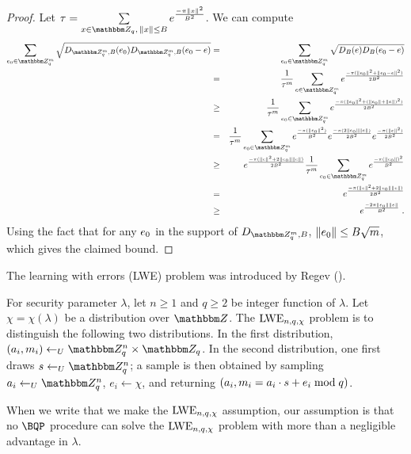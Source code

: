 \begin{proof}
Let $\tau = \sum\limits_{x\in\mZ_q,\, \|x\|\leq B}e^{\frac{-\pi\lVert x\rVert^2}{B^2}}$. We can compute
\begin{eqnarray*}
\sum_{\*e_0\in \mZ_q^m} \sqrt{D_{\mZ_q^{m},B}(\*e_0)D_{\mZ_q^{m},B}(\*e_0-\*e)} &=& \sum_{\*e_0\in \mZ_q^m}  \sqrt{D_{B}(\*e)D_{B}(\*e_0-\*e)}\\
&=& \frac{1}{\tau^m}\sum_{\*e\in \mZ_q^m}e^{\frac{-\pi(\|\*e_0\|^2 + \|\*e_0 - \*e\|^2)}{2B^2}}\\
&\geq& \frac{1}{\tau^m}\sum_{\*e_0\in \mZ_q^m}e^{\frac{-\pi(\|\*e_0\|^2 + (\|\*e_0\| + \|\*e\|)^2)}{2B^2}}\\
&=& \frac{1}{\tau^m}\sum_{\*e_0\in \mZ_q^m}e^{\frac{-\pi(\|\*e_0\|^2)}{B^2}}e^{\frac{-\pi(2\|\*e_0\|\|\*e\|)}{2B^2}}e^{\frac{-\pi(\|\*e\|^2)}{2B^2}}\\
&\geq& e^{\frac{-\pi(\|\*e\|^2 + 2\|\*e_0\|\|\*e\|)}{2B^2}}\frac{1}{\tau^m}\sum_{\*e_0\in \mZ_q^m}e^{\frac{-\pi(\|\*e_0\|)^2}{B^2}}\\
&=& e^{\frac{-\pi(\|\*e\|^2 + 2\|\*e_0\|\|\*e\|)}{2B^2}}\label{eq:distequality}\\
&\geq& e^{\frac{-2\pi \|\*e_0\|\|\*e\|}{B^2}}\;.
\end{eqnarray*}
Using the fact that for any $\*e_0$ in the support of $D_{\mZ_q^m,B}$, $\|\*e_0\|\leq B\sqrt{m}$, which gives the claimed bound.
\end{proof}


\iffalse
The learning with errors (LWE) problem was introduced by Regev (\cite{regev2005}).

\begin{deff}
For security parameter $\lambda$, let $n\geq 1$ and $q\geq 2$ be integer function of $\lambda$. Let $\chi = \chi(\lambda)$ be a distribution over $\mZ$. The $\mathrm{LWE}_{n,q,\chi}$ problem is to distinguish the following two distributions. In the first distribution, $(\*a_i,m_i)\leftarrow_U \mZ_q^{n}\times \mZ_q$. In the second distribution, one first draws $\*s\leftarrow_U \mZ_q^{n}$; a sample is then obtained by sampling $a_i\leftarrow_U \mZ_q^n$, $e_i\leftarrow \chi$, and returning $(a_i,m_i =  \*a_i\cdot \*s + \*e_i \bmod q)$.

When we write that we make the $\mathrm{LWE}_{n,q,\chi}$ assumption, our assumption is that no $\BQP$ procedure can solve the $\mathrm{LWE}_{n,q,\chi}$ problem with more than a negligible advantage in $\lambda$. 
\end{deff}

